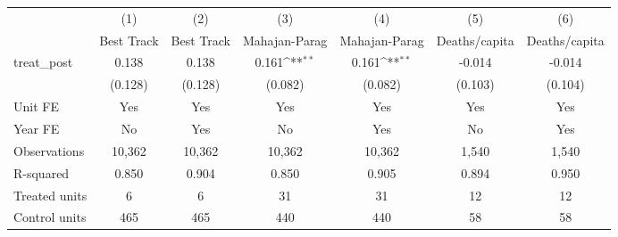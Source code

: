 {
\def\sym#1{\ifmmode^{#1}\else\(^{#1}\)\fi}
\begin{tabular}{l*{6}{c}}
\toprule
                    &\multicolumn{1}{c}{(1)}&\multicolumn{1}{c}{(2)}&\multicolumn{1}{c}{(3)}&\multicolumn{1}{c}{(4)}&\multicolumn{1}{c}{(5)}&\multicolumn{1}{c}{(6)}\\
                    &\multicolumn{1}{c}{Best Track}&\multicolumn{1}{c}{Best Track}&\multicolumn{1}{c}{Mahajan-Parag}&\multicolumn{1}{c}{Mahajan-Parag}&\multicolumn{1}{c}{Deaths/capita}&\multicolumn{1}{c}{Deaths/capita}\\
\midrule
treat\_post          &       0.138         &       0.138         &       0.161\sym{**} &       0.161\sym{**} &      -0.014         &      -0.014         \\
                    &     (0.128)         &     (0.128)         &     (0.082)         &     (0.082)         &     (0.103)         &     (0.104)         \\
\midrule
Unit FE             &         Yes         &         Yes         &         Yes         &         Yes         &         Yes         &         Yes         \\
Year FE             &          No         &         Yes         &          No         &         Yes         &          No         &         Yes         \\
Observations        &      10,362         &      10,362         &      10,362         &      10,362         &       1,540         &       1,540         \\
R-squared           &       0.850         &       0.904         &       0.850         &       0.905         &       0.894         &       0.950         \\
Treated units       &           6         &           6         &          31         &          31         &          12         &          12         \\
Control units       &         465         &         465         &         440         &         440         &          58         &          58         \\
\bottomrule
\end{tabular}
}
